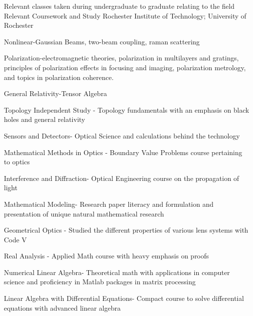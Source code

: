 \begin{cventries}
    \cventry
    {Relevant classes taken during undergraduate to graduate relating to the field}
    {Relevant Coursework and Study}
    {Rochester Institute of Technology; University of Rochester}
    {}
    {
      \begin{cvitems}
        \item{Nonlinear-Gaussian Beams, two-beam coupling, raman scattering}
        \item{Polarization-electromagnetic theories, polarization in multilayers and gratings, principles of polarization effects in focusing and imaging, polarization metrology, and topics in polarization coherence.}
        \item{General Relativity-Tensor Algebra}
        \item {Topology Independent Study - Topology fundamentals with an emphasis on black holes and general relativity}
        \item{Sensors and Detectors- Optical Science and calculations behind the technology}
        \item {Mathematical Methods in Optics - Boundary Value Problems course pertaining to optics}
        \item {Interference and Diffraction- Optical Engineering course on the propagation of light}
        \item {Mathematical Modeling- Research paper literacy and formulation and presentation of unique natural mathematical research}
        \item {Geometrical Optics - Studied the different properties of various lens systems with Code V}
        \item {Real Analysis - Applied Math course with heavy emphasis on proofs}
        \item {Numerical Linear Algebra- Theoretical math with applications in computer science and proficiency in Matlab packages in matrix processing}
        \item {Linear Algebra with Differential Equations- Compact course to solve differential equations with advanced linear algebra}
      \end{cvitems}
    }



\end{cventries}
